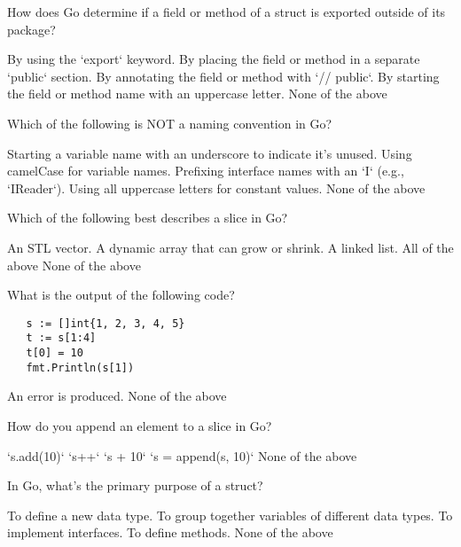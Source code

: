 \documentclass[12pt]{exam}
\begin{document}
\begin{questions}
\question[2]  How does Go determine if a field or method of a struct is exported outside of its package?
\begin{choices}
\choice  By using the `export` keyword.
\choice  By placing the field or method in a separate `public` section.
\choice  By annotating the field or method with `// public`.
\CorrectChoice  By starting the field or method name with an uppercase letter.
\choice  None of the above
\end{choices}
 
\question[2]  Which of the following is NOT a naming convention in Go?
\begin{choices}
\choice  Starting a variable name with an underscore to indicate it's unused.
\choice  Using camelCase for variable names.
\CorrectChoice  Prefixing interface names with an `I` (e.g., `IReader`).
\choice  Using all uppercase letters for constant values.
\choice  None of the above
\end{choices}
 
\question[2]  Which of the following best describes a slice in Go?
\begin{choices}
\choice  An STL vector.
\choice  A dynamic array that can grow or shrink.
\choice  A linked list.
\CorrectChoice  All of the above
\choice  None of the above
\end{choices}
 
\question[2]  What is the output of the following code?
\begin{mdframed}[backgroundcolor=bg]
\begin{verbatim}
   s := []int{1, 2, 3, 4, 5}
   t := s[1:4]
   t[0] = 10
   fmt.Println(s[1])
\end{verbatim}
\end{mdframed}
\begin{choices}
\choice  An error is produced.
\choice  None of the above
\end{choices}
 
\question[2]  How do you append an element to a slice in Go?
\begin{choices}
\choice  `s.add(10)`
\choice  `s++`
\choice  `s + 10`
\CorrectChoice  `s = append(s, 10)`
\choice  None of the above
\end{choices}
 
\question[2]  In Go, what's the primary purpose of a struct?
\begin{choices}
\choice  To define a new data type.
\CorrectChoice  To group together variables of different data types.
\choice  To implement interfaces.
\choice  To define methods.
\choice  None of the above
\end{choices}
 

\end{questions}
\end{document}
